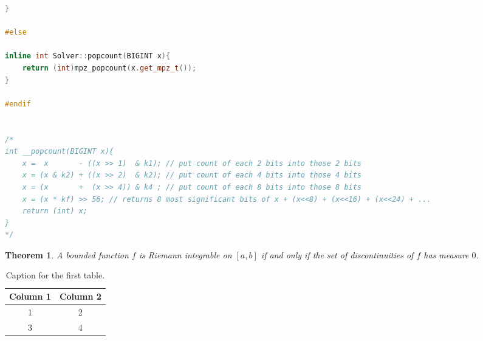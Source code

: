 \documentclass[12pt]{etsu_thesis}
\newtheorem{theorem}[fact]{Theorem}
\begin{document}
\begin{lstlisting}[language=C++]
}

#else

inline int Solver::popcount(BIGINT x){
    return (int)mpz_popcount(x.get_mpz_t());
}

#endif


/*
int __popcount(BIGINT x){
	x =  x       - ((x >> 1)  & k1); // put count of each 2 bits into those 2 bits 
	x = (x & k2) + ((x >> 2)  & k2); // put count of each 4 bits into those 4 bits 
	x = (x       +  (x >> 4)) & k4 ; // put count of each 8 bits into those 8 bits 
	x = (x * kf) >> 56; // returns 8 most significant bits of x + (x<<8) + (x<<16) + (x<<24) + ...  
	return (int) x;
}
*/


\end{lstlisting}


\begin{theorem}
{{\rm \cite{kirkwood}} A bounded function $f$ is Riemann integrable on $[a,b]$ if and only if the set of discontinuities of $f$ has measure $0$.}
\end{theorem}


\begin{table}[h]
\caption{\label{tabletitle1} Caption for the first table.}
\begin{center}
\begin{tabular}{|c|c|}\hline\hline
Column 1 & Column 2 \\ \hline\hline
1 & 2 \\ \hline
3 & 4 \\ \hline\hline
\end{tabular}
\end{center}
\end{table}
\end{document}
